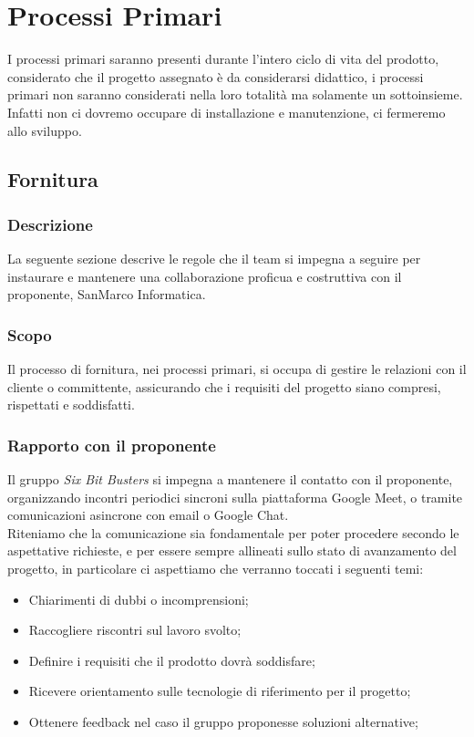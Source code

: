 \section{Processi Primari}
I processi primari saranno presenti durante l'intero ciclo di vita del prodotto, 
considerato che il progetto assegnato è da considerarsi didattico, i processi 
primari non saranno considerati nella loro totalità ma solamente un sottoinsieme.\\
Infatti non ci dovremo occupare di installazione e manutenzione, ci fermeremo allo sviluppo.

    \subsection{Fornitura}
        \subsubsection{Descrizione}
        La seguente sezione descrive le regole che il team si impegna a seguire 
        per instaurare e mantenere una collaborazione proficua e costruttiva con il proponente, 
        SanMarco Informatica.
        \subsubsection{Scopo}
        Il processo di fornitura, nei processi primari, si occupa di gestire le relazioni 
        con il cliente o committente, assicurando che i requisiti del progetto siano 
        compresi, rispettati e soddisfatti.
        \subsubsection{Rapporto con il proponente}
        Il gruppo \textit{Six Bit Busters} si impegna a mantenere il contatto con il proponente, 
        organizzando incontri periodici sincroni sulla piattaforma Google Meet, o tramite comunicazioni 
        asincrone con email o Google Chat.\\
        Riteniamo che la comunicazione sia fondamentale per poter procedere secondo le aspettative 
        richieste, e per essere sempre allineati sullo stato di avanzamento del progetto, in particolare 
        ci aspettiamo che verranno toccati i seguenti temi:
        \begin{itemize}
            \item Chiarimenti di dubbi o incomprensioni;
            \item Raccogliere riscontri sul lavoro svolto;
            \item Definire i requisiti che il prodotto dovrà soddisfare;
            \item Ricevere orientamento sulle tecnologie di riferimento per il progetto;
            \item Ottenere feedback nel caso il gruppo proponesse soluzioni alternative;  
        \end{itemize}
